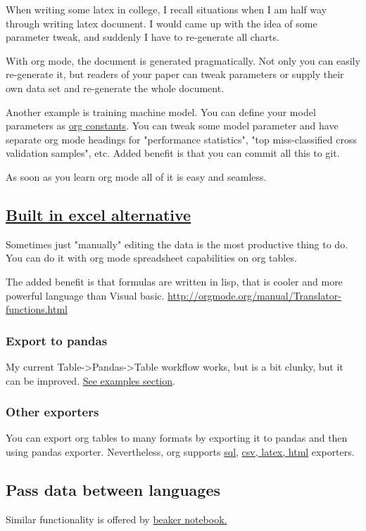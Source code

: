 \documentclass[11pt]{article}
\begin{document}
When writing some latex in college, I recall situations when I am half
way through writing latex document. I would came up with the idea of
some parameter tweak, and suddenly I have to re-generate all charts.

With org mode, the document is generated pragmatically. Not only
you can easily re-generate it, but readers of your paper can tweak
parameters or supply their own data set and re-generate the whole document.

Another example is training machine model. You can define your model parameters as \href{http://orgmode.org/manual/In_002dbuffer-settings.html}{org constants}.
You can tweak some model parameter and have separate org mode headings for "performance statistics",
"top miss-classified cross validation samples", etc. Added benefit is that you can commit all this to git.

As soon as you learn org mode all of it is easy and seamless.
\subsection{\href{http://orgmode.org/manual/The-spreadsheet.html#The-spreadsheet}{Built in excel alternative}}
\label{sec:orgheadline9}
Sometimes just "manually" editing the data is the most productive thing to do.
You can do it with org mode spreadsheet capabilities on org tables.

The added benefit is that formulas are written in lisp, that is cooler and more powerful language than Visual basic.
\url{http://orgmode.org/manual/Translator-functions.html}
\subsubsection{Export to pandas}
\label{sec:orgheadline7}
My current Table->Pandas->Table workflow works, but is a bit clunky, but it can be improved.
\hyperref[sec:orgheadline6]{See examples section}.
\subsubsection{Other exporters}
\label{sec:orgheadline8}
You can export org tables to many formats by exporting it to pandas and then
using pandas exporter.
Nevertheless, org supports \href{https://github.com/stuartsierra/org-mode/blob/master/contrib/lisp/orgtbl-sqlinsert.el}{sql}, \href{http://orgmode.org/manual/Translator-functions.html}{csv, latex, html} exporters.
\subsection{Pass data between languages}
\label{sec:orgheadline11}
Similar functionality is offered by \href{http://beakernotebook.com/}{beaker notebook.}
\end{document}

